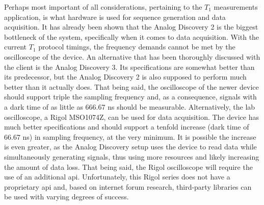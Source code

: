 Perhaps most important of all considerations, pertaining to the $T_1$ measurements application, is what hardware is used for sequence generation and data acquisition. It has already been shown that the Analog Discovery 2 is the biggest bottleneck of the system, specifically when it comes to data acquisition. With the current $T_1$ protocol timings, the frequency demands cannot be met by the oscilloscope of the device. An alternative that has been thoroughly discussed with the client is the Analog Discovery 3. Its specifications are somewhat better than its predecessor, but the Analog Discovery 2 is also supposed to perform much better than it actually does. That being said, the oscilloscope of the newer device should support triple the sampling frequency and, as a consequence, signals with a dark time of as little as \num{666,67} \unit{\nano\second} should be measurable. Alternatively, the lab oscilloscope, a Rigol MSO1074Z, can be used for data acquisition. The device has much better specifications and should support a tenfold increase (dark time of \num{66,67} \unit{\nano\second}) in sampling frequency, at the very minimum. It is possible the increase is even greater, as the Analog Discovery setup uses the device to read data while simultaneously generating signals, thus using more resources and likely increasing the amount of data loss. That being said, the Rigol oscilloscope will require the use of an additional \gls{api}. Unfortunately, this Rigol series does not have a proprietary \gls{api} and, based on internet forum research, third-party libraries can be used with varying degrees of success.



